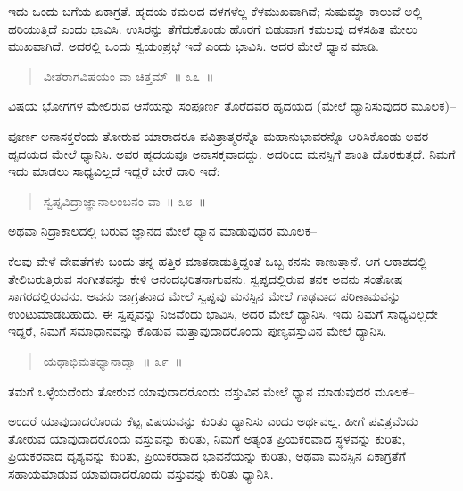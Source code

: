 ಇದು ಒಂದು ಬಗೆಯ ಏಕಾಗ್ರತೆ. ಹೃದಯ ಕಮಲದ ದಳಗಳೆಲ್ಲ ಕೆಳಮುಖವಾಗಿವೆ; ಸುಷುಮ್ನಾ ಕಾಲುವೆ ಅಲ್ಲಿ ಹರಿಯುತ್ತಿದೆ ಎಂದು ಭಾವಿಸಿ. ಉಸಿರನ್ನು ತೆಗೆದುಕೊಂಡು ಹೊರಗೆ ಬಿಡುವಾಗ ಕಮಲವು ದಳಸಹಿತ ಮೇಲು ಮುಖವಾಗಿದೆ. ಅದರಲ್ಲಿ ಒಂದು ಸ್ವಯಂಪ್ರಭೆ ಇದೆ ಎಂದು ಭಾವಿಸಿ. ಅದರ ಮೇಲೆ ಧ್ಯಾನ ಮಾಡಿ. 

\vspace{-0.3cm}

\begin{verse}
ವೀತರಾಗವಿಷಯಂ ವಾ ಚಿತ್ತಮ್​~॥ ೩೭~॥
\end{verse}

\vspace{-0.3cm}

ವಿಷಯ ಭೋಗಗಳ ಮೇಲಿರುವ ಆಸೆಯನ್ನು ಸಂಪೂರ್ಣ ತೊರೆದವರ ಹೃದಯದ (ಮೇಲೆ ಧ್ಯಾನಿಸುವುದರ ಮೂಲಕ)–

ಪೂರ್ಣ ಅನಾಸಕ್ತರೆಂದು ತೋರುವ ಯಾರಾದರೂ ಪವಿತ್ರಾತ್ಮರನ್ನೊ ಮಹಾನುಭಾವರನ್ನೊ ಆರಿಸಿಕೊಂಡು ಅವರ ಹೃದಯದ ಮೇಲೆ ಧ್ಯಾನಿಸಿ. ಅವರ ಹೃದಯವೂ ಅನಾಸಕ್ತವಾದದ್ದು. ಅದರಿಂದ ಮನಸ್ಸಿಗೆ ಶಾಂತಿ ದೊರಕುತ್ತದೆ. ನಿಮಗೆ ಇದು ಮಾಡಲು ಸಾಧ್ಯವಿಲ್ಲದೆ ಇದ್ದರೆ ಬೇರೆ ದಾರಿ ಇದೆ:

\vspace{-0.3cm}

\begin{verse}
ಸ್ವಪ್ನವಿದ್ರಾಜ್ಞಾನಾಲಂಬನಂ ವಾ~॥ ೩೮~॥
\end{verse}

\vspace{-0.3cm}

ಅಥವಾ ನಿದ್ರಾಕಾಲದಲ್ಲಿ ಬರುವ ಜ್ಞಾನದ ಮೇಲೆ ಧ್ಯಾನ ಮಾಡುವುದರ ಮೂಲಕ–

ಕೆಲವು ವೇಳೆ ದೇವತೆಗಳು ಬಂದು ತನ್ನ ಹತ್ತಿರ ಮಾತನಾಡುತ್ತಿದ್ದಂತೆ ಒಬ್ಬ ಕನಸು ಕಾಣುತ್ತಾನೆ. ಆಗ ಆಕಾಶದಲ್ಲಿ ತೇಲಿಬರುತ್ತಿರುವ ಸಂಗೀತವನ್ನು ಕೇಳಿ ಆನಂದಭರಿತನಾಗುವನು. ಸ್ವಪ್ನದಲ್ಲಿರುವ ತನಕ ಅವನು ಸಂತೋಷ ಸಾಗರದಲ್ಲಿರುವನು. ಅವನು ಜಾಗ್ರತನಾದ ಮೇಲೆ ಸ್ವಪ್ನವು ಮನಸ್ಸಿನ ಮೇಲೆ ಗಾಢವಾದ ಪರಿಣಾಮವನ್ನು ಉಂಟುಮಾಡಬಹುದು. ಈ ಸ್ವಪ್ನವನ್ನು ನಿಜವೆಂದು ಭಾವಿಸಿ, ಅದರ ಮೇಲೆ ಧ್ಯಾನಿಸಿ. ಇದು ನಿಮಗೆ ಸಾಧ್ಯವಿಲ್ಲದೇ ಇದ್ದರೆ, ನಿಮಗೆ ಸಮಾಧಾನವನ್ನು ಕೊಡುವ ಮತ್ತಾವುದಾದರೊಂದು ಪುಣ್ಯವಸ್ತುವಿನ ಮೇಲೆ ಧ್ಯಾನಿಸಿ. 

\vspace{-0.3cm}

\begin{verse}
ಯಥಾಭಿಮತಧ್ಯಾನಾದ್ವಾ~॥ ೩೯~॥
\end{verse}

\vspace{-0.3cm}

ತಮಗೆ ಒಳ್ಳೆಯದೆಂದು ತೋರುವ ಯಾವುದಾದರೊಂದು ವಸ್ತುವಿನ ಮೇಲೆ ಧ್ಯಾನ ಮಾಡುವುದರ ಮೂಲಕ–

ಅಂದರೆ ಯಾವುದಾದರೊಂದು ಕೆಟ್ಟ ವಿಷಯವನ್ನು ಕುರಿತು ಧ್ಯಾನಿಸು ಎಂದು ಅರ್ಥವಲ್ಲ. ಹೀಗೆ ಪವಿತ್ರವೆಂದು ತೋರುವ ಯಾವುದಾದರೊಂದು ವಸ್ತುವನ್ನು ಕುರಿತು, ನಿಮಗೆ ಅತ್ಯಂತ ಪ್ರಿಯಕರವಾದ ಸ್ಥಳವನ್ನು ಕುರಿತು, ಪ್ರಿಯಕರವಾದ ದೃಶ್ಯವನ್ನು ಕುರಿತು, ಪ್ರಿಯಕರವಾದ ಭಾವನೆಯನ್ನು ಕುರಿತು, ಅಥವಾ ಮನಸ್ಸಿನ ಏಕಾಗ್ರತೆಗೆ ಸಹಾಯಮಾಡುವ ಯಾವುದಾದರೊಂದು ವಸ್ತುವನ್ನು ಕುರಿತು ಧ್ಯಾನಿಸಿ. 

